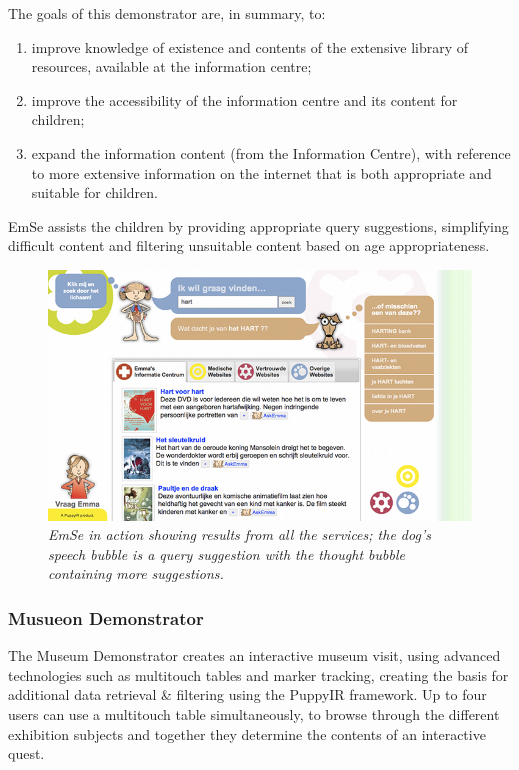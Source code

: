 \documentclass[letterpaper,10pt,english]{sphinxmanual}
\begin{document}
The goals of this demonstrator are, in summary, to:
\begin{enumerate}
\item {} 
improve knowledge of existence and contents of the extensive library of resources, available at the information centre;

\item {} 
improve the accessibility of the information centre and its content for children;

\item {} 
expand the information content (from the Information Centre), with reference to more extensive information on the internet that is both appropriate and suitable for children.

\end{enumerate}

EmSe assists the children by providing appropriate query suggestions, simplifying difficult content and filtering unsuitable content based on age appropriateness.
\begin{figure}[htbp]
\centering
\capstart

\includegraphics{puppy-emse.png}
\caption{\emph{EmSe in action showing results from all the services; the dog's speech bubble is a query suggestion with the thought bubble containing more suggestions.}}\end{figure}


\subsubsection{Musueon Demonstrator}
\label{repo:musueon-demonstrator}
The Museum Demonstrator creates an interactive museum visit, using advanced technologies such as multitouch tables and marker tracking, creating the basis for additional data retrieval \& filtering using the PuppyIR framework. Up to four users can use a multitouch table simultaneously, to browse through the different exhibition subjects and together they determine the contents of an interactive quest.
\end{document}
